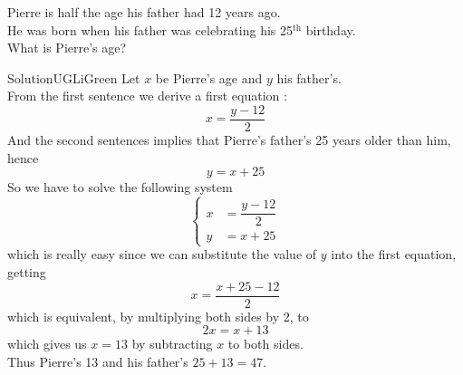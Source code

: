 \documentclass[12pt,a4paper,article,english,firamath]{nsi}
\begin{document}
\begin{exercice}[]
    Pierre is half the age his father had 12 years ago.\\
    He was born when his father was celebrating his 25$^{\text{th}}$ birthday.\\
    
    What is Pierre's age?
\end{exercice}
\begin{encadrecolore}{Solution}{UGLiGreen}
    Let $x$ be Pierre's age and $y$ his father's.\\
    From the first sentence we derive a first equation :
    $$x = \dfrac{y-12}{2}$$
    And the second sentences implies that Pierre's father's 25 years older than him, hence
    $$y = x + 25$$
    So we have to solve the following system
    $$\begin{cases}
         x & = \dfrac{y-12}{2} \\
         y &= x + 25
    \end{cases}$$
    which is really easy since we can substitute the value of $y$ into the first equation, getting
    $$x = \dfrac{x+25-12}{2}$$
    which is equivalent, by multiplying both sides by 2, to
    $$2x = x + 13$$
    which gives us $x=13$ by subtracting $x$ to both sides.\\

    Thus Pierre's 13 and his father's $25+13=47$.
\end{encadrecolore}
\end{document}
